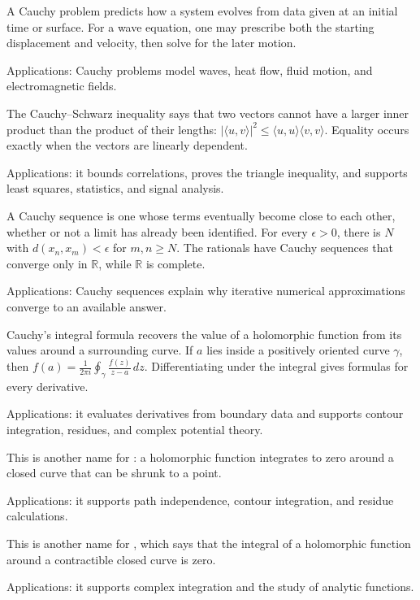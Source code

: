 A Cauchy problem predicts how a system evolves from data given at an initial time or surface. For a wave equation, one may prescribe both the starting displacement and velocity, then solve for the later motion. \par\noindent Applications: Cauchy problems model waves, heat flow, fluid motion, and electromagnetic fields.

The Cauchy--Schwarz inequality says that two vectors cannot have a larger inner product than the product of their lengths: $|\langle u,v\rangle|^2\le\langle u,u\rangle\langle v,v\rangle$. Equality occurs exactly when the vectors are linearly dependent. \par\noindent Applications: it bounds correlations, proves the triangle inequality, and supports least squares, statistics, and signal analysis.

A Cauchy sequence is one whose terms eventually become close to each other, whether or not a limit has already been identified. For every $\epsilon>0$, there is $N$ with $d(x_n,x_m)<\epsilon$ for $m,n\ge N$. The rationals have Cauchy sequences that converge only in $\mathbb R$, while $\mathbb R$ is complete. \par\noindent Applications: Cauchy sequences explain why iterative numerical approximations converge to an available answer.

Cauchy's integral formula recovers the value of a holomorphic function from its values around a surrounding curve. If $a$ lies inside a positively oriented curve $\gamma$, then $f(a)=\frac{1}{2\pi i}\oint_\gamma\frac{f(z)}{z-a}\,dz$. Differentiating under the integral gives formulas for every derivative. \par\noindent Applications: it evaluates derivatives from boundary data and supports contour integration, residues, and complex potential theory.

This is another name for : a holomorphic function integrates to zero around a closed curve that can be shrunk to a point. \par\noindent Applications: it supports path independence, contour integration, and residue calculations.

This is another name for , which says that the integral of a holomorphic function around a contractible closed curve is zero. \par\noindent Applications: it supports complex integration and the study of analytic functions.

